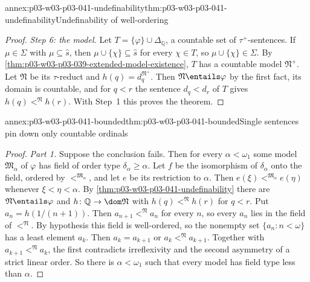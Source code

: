 \begin{annexitem}{annex:p03-w03-p03-041-undefinability}{thm:p03-w03-p03-041-undefinability}{Undefinability of well-ordering}
\begin{proof}
\emph{Step 6: the model.} Let \(T=\{\varphi\}\cup\Delta_{\mathbb Q}\), a
countable set of \(\tau^{+}\)-sentences. If \(\mu\in\Sigma\) with
\(\mu\subseteq\hat s\), then \(\mu\cup\{\chi\}\subseteq\hat s\) for every
\(\chi\in T\), so \(\mu\cup\{\chi\}\in\Sigma\). By
\cref{thm:p03-w03-p03-039-extended-model-existence}, \(T\) has a countable
model \(\mathfrak N^{+}\). Let \(\mathfrak N\) be its \(\tau\)-reduct and
\(h(q)=d_q^{\mathfrak N^{+}}\). Then \(\mathfrak N\entails\varphi\) by the
first fact, its domain is countable, and for \(q<r\) the sentence
\(d_q<d_r\) of \(T\) gives \(h(q)<^{\mathfrak N}h(r)\). With Step~1 this
proves the theorem.
\end{proof}
\end{annexitem}

\begin{annexitem}{annex:p03-w03-p03-041-bounded}{thm:p03-w03-p03-041-bounded}{Single sentences pin down only countable ordinals}
\begin{proof}
\emph{Part 1.} Suppose the conclusion fails. Then for every
\(\alpha<\omega_1\) some model \(\mathfrak M_\alpha\) of \(\varphi\) has
field of order type \(\delta_\alpha\geq\alpha\). Let \(f\) be the
isomorphism of \(\delta_\alpha\) onto the field, ordered by
\(<^{\mathfrak M_\alpha}\), and let \(e\) be its restriction to
\(\alpha\). Then \(e(\xi)<^{\mathfrak M_\alpha}e(\eta)\) whenever
\(\xi<\eta<\alpha\). By \cref{thm:p03-w03-p03-041-undefinability} there
are \(\mathfrak N\entails\varphi\) and
\(h\colon\mathbb Q\to\dom\mathfrak N\) with \(h(q)<^{\mathfrak N}h(r)\)
for \(q<r\). Put \(a_n=h(1/(n+1))\). Then \(a_{n+1}<^{\mathfrak N}a_n\) for
every \(n\), so every \(a_n\) lies in the field of \(<^{\mathfrak N}\). By
hypothesis this field is well-ordered, so the nonempty set
\(\{a_n:n<\omega\}\) has a least element \(a_k\). Then \(a_k=a_{k+1}\) or
\(a_k<^{\mathfrak N}a_{k+1}\). Together with \(a_{k+1}<^{\mathfrak N}a_k\),
the first contradicts irreflexivity and the second asymmetry of a strict
linear order. So there is \(\alpha<\omega_1\) such that every model has
field type less than \(\alpha\).


\end{proof}
\end{annexitem}
